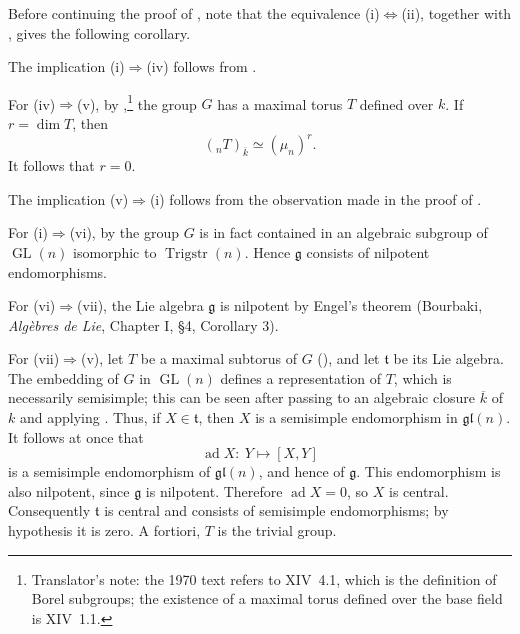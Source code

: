 
Before continuing the proof of , note that the equivalence
(i)\(\Leftrightarrow\)(ii), together with , gives the
following corollary.


The implication (i)\(\Rightarrow\)(iv) follows from .

For (iv)\(\Rightarrow\)(v), by ,\footnote{Translator's
note: the 1970 text refers to XIV~4.1, which is the definition of
Borel subgroups; the existence of a maximal torus defined over the
base field is XIV~1.1.} the group \(G\)
has a maximal torus \(T\) defined over \(k\).  If \(r=\dim T\),
then
\[
  ({}_nT)_{\overline{k}}\simeq(\mu_n)^r.
\]
It follows that \(r=0\).

The implication (v)\(\Rightarrow\)(i) follows from the observation
made in the proof of .

For (i)\(\Rightarrow\)(vi), by  the group \(G\) is in fact
contained in an algebraic subgroup of \(\operatorname{GL}(n)\)
isomorphic to \(\operatorname{Trigstr}(n)\).  Hence
\(\mathfrak g\) consists of nilpotent endomorphisms.

For (vi)\(\Rightarrow\)(vii), the Lie algebra \(\mathfrak g\) is
nilpotent by Engel's theorem (Bourbaki, \emph{Algèbres de Lie},
Chapter I, \S4, Corollary 3).

For (vii)\(\Rightarrow\)(v), let \(T\) be a maximal subtorus of
\(G\) (), and let \(\mathfrak t\) be its Lie
algebra.  The embedding of \(G\) in \(\operatorname{GL}(n)\)
defines a representation of \(T\), which is necessarily
semisimple; this can be seen after passing to an algebraic closure
\(\overline{k}\) of \(k\) and applying .  Thus, if
\(X\in\mathfrak t\), then \(X\) is a semisimple endomorphism in
\(\mathfrak{gl}(n)\).  It follows at once that
\[
  \operatorname{ad}X:\ Y\longmapsto[X,Y]
\]
is a semisimple endomorphism of \(\mathfrak{gl}(n)\), and hence of
\(\mathfrak g\).  This endomorphism is also nilpotent, since
\(\mathfrak g\) is nilpotent.  Therefore
\(\operatorname{ad}X=0\), so \(X\) is central.  Consequently
\(\mathfrak t\) is central and consists of semisimple
endomorphisms; by hypothesis it is zero.  A fortiori, \(T\) is the
trivial group.

